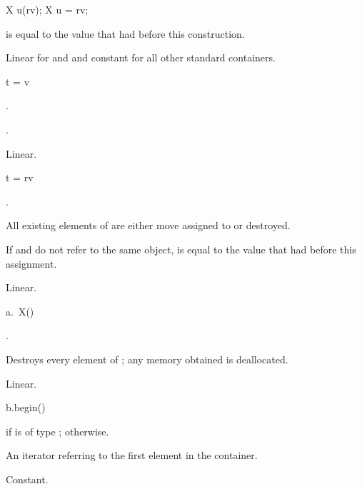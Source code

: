 \begin{itemdecl}
X u(rv);
X u = rv;
\end{itemdecl}

\begin{itemdescr}
\pnum
\ensures
{} is equal to the value that  had before this construction.

\pnum
\complexity
Linear for  and  and constant for all other standard containers.
\end{itemdescr}

%
\begin{itemdecl}
t = v
\end{itemdecl}

\begin{itemdescr}
\pnum
\result
{}.

\pnum
\ensures
{}.

\pnum
\complexity
Linear.
\end{itemdescr}

\begin{itemdecl}
t = rv
\end{itemdecl}

\begin{itemdescr}
\pnum
\result
{}.

\pnum
\effects
All existing elements of  are either move assigned to or destroyed.

\pnum
\ensures
If  and  do not refer to the same object,
 is equal to the value that  had before this assignment.

\pnum
\complexity
Linear.
\end{itemdescr}

\begin{itemdecl}
a.~X()
\end{itemdecl}

\begin{itemdescr}
\pnum
\result
{}.

\pnum
\effects
Destroys every element of ; any memory obtained is deallocated.

\pnum
\complexity
Linear.
\end{itemdescr}

%
\begin{itemdecl}
b.begin()
\end{itemdecl}

\begin{itemdescr}
\pnum
\result
{} if  is of type ;
 otherwise.

\pnum
\returns
An iterator referring to the first element in the container.

\pnum
\complexity
Constant.
\end{itemdescr}


